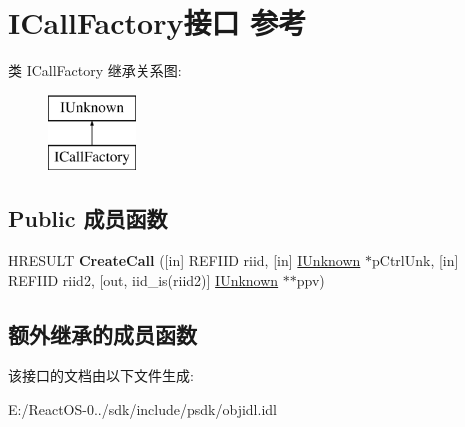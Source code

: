 \hypertarget{interface_i_call_factory}{}\section{I\+Call\+Factory接口 参考}
\label{interface_i_call_factory}
类 I\+Call\+Factory 继承关系图\+:\begin{figure}[H]
\begin{center}
\leavevmode
\includegraphics[height=2.000000cm]{interface_i_call_factory}
\end{center}
\end{figure}
\subsection*{Public 成员函数}
\begin{DoxyCompactItemize}
\item 
\mbox{\label{interface_i_call_factory_a0e15bb5cdf033d56c4cc860d24289c30}} 
H\+R\+E\+S\+U\+LT {\bfseries Create\+Call} (\mbox{[}in\mbox{]} R\+E\+F\+I\+ID riid, \mbox{[}in\mbox{]} \hyperlink{interface_i_unknown}{I\+Unknown} $\ast$p\+Ctrl\+Unk, \mbox{[}in\mbox{]} R\+E\+F\+I\+ID riid2, \mbox{[}out, iid\+\_\+is(riid2)\mbox{]} \hyperlink{interface_i_unknown}{I\+Unknown} $\ast$$\ast$ppv)
\end{DoxyCompactItemize}
\subsection*{额外继承的成员函数}


该接口的文档由以下文件生成\+:\begin{DoxyCompactItemize}
\item 
E\+:/\+React\+O\+S-\/0../sdk/include/psdk/objidl.\+idl\end{DoxyCompactItemize}
